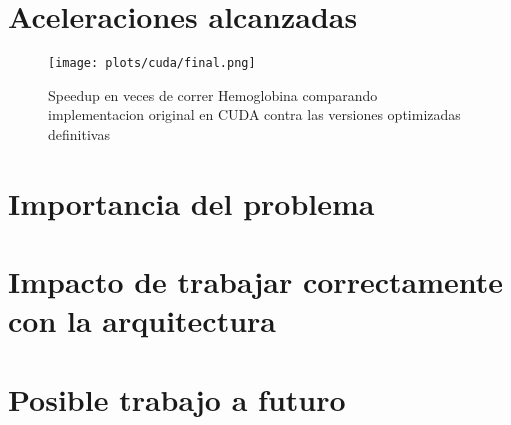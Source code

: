 \section{Aceleraciones alcanzadas}

\begin{figure}[htbp]
   \centering
   \texttt{[image: plots/cuda/final.png]}
   \caption{Speedup en veces de correr Hemoglobina comparando implementacion original en CUDA contra
   las versiones optimizadas definitivas}
   \label{plt:cuda-final}
\end{figure}


\section{Importancia del problema}
\section{Impacto de trabajar correctamente con la arquitectura}
\section{Posible trabajo a futuro}

